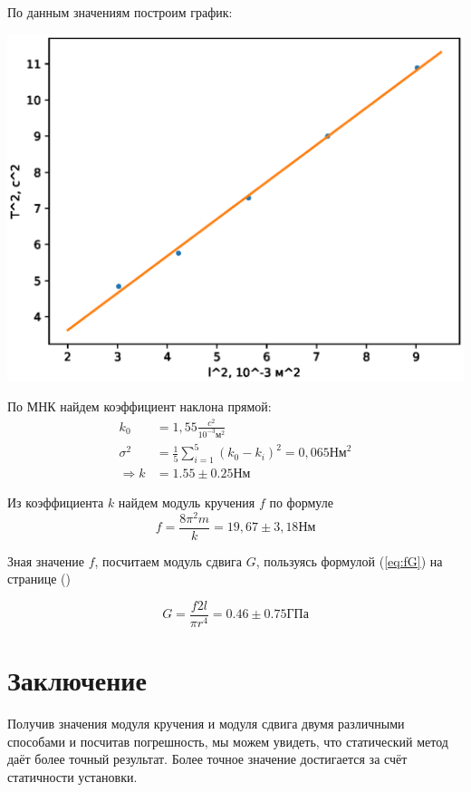 \documentclass[a4paper, 12pt]{article}
\begin{document}
По данным значениям построим график:

\includegraphics[scale = 0.7]{dynamic.eps}

По МНК найдем коэффициент наклона прямой:
\begin{align*}
k_0 &= 1,55 \frac{c^2}{10^{-3} \text{м}^2} \\
\sigma^2 &= \frac{1}{5}\sum_{i=1}^5 (k_0 - k_i)^2 = 0,065 \text{Нм}^2 \\
\Rightarrow k &= 1.55 \pm 0.25 \text{Нм}
\end{align*}

Из коэффициента $k$ найдем модуль кручения $f$ по формуле
\[
f = \frac{8\pi^2m}{k} = 19,67 \pm 3,18 \text{Нм}
\]

Зная значение $f$, посчитаем модуль сдвига $G$, пользуясь формулой (\ref{eq:fG}) на странице (\pageref{eq:fG})

\[
G = \frac{f2l}{\pi r^4} = 0.46 \pm 0.75 \text{ГПа}
\]

\section{Заключение}

Получив значения модуля кручения и модуля сдвига двумя различными способами и посчитав погрешность, мы можем увидеть,
что статический метод даёт более точный результат. Более точное значение достигается за счёт статичности установки.
\end{document}
